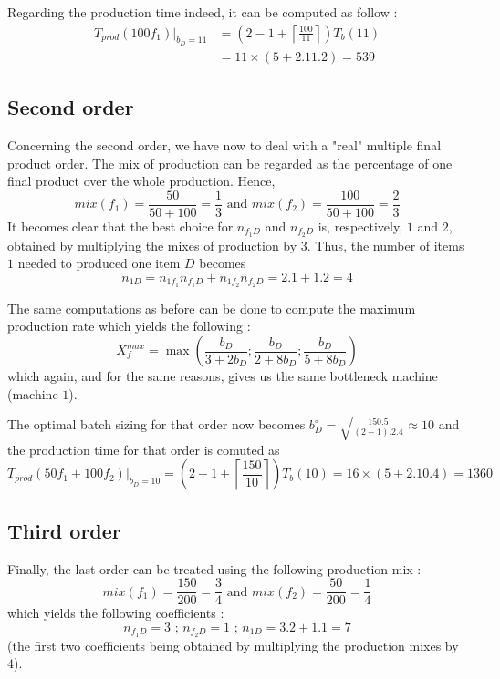 Regarding the production time indeed, it can be computed as follow : 
\[
    \begin{split}
        T_{prod}(100f_1)|_{b_D = 11} &= \left(2-1+\left\lceil \frac{100}{11} \right\rceil\right)T_b(11) \\
        &= 11\times(5+2.11.2) = 539
    \end{split}
\]

\subsection{Second order}

Concerning the second order, we have now to deal with a "real" multiple final product order. The mix of production can be regarded as the percentage of one final product over the whole production. Hence, 
\[
    mix(f_1) = \frac{50}{50 + 100} = \frac{1}{3}\textrm{ and }
    mix(f_2) = \frac{100}{50 + 100} = \frac{2}{3}
\]
It becomes clear that the best choice for $n_{f_1D}$ and $n_{f_2D}$ is, respectively, $1$ and $2$, obtained by multiplying the mixes of production by $3$. Thus, the number of items $1$ needed to produced one item $D$ becomes \[ n_{1D} = n_{1f_1}n_{f_1D} + n_{1f_2}n_{f_2D} = 2.1+1.2 = 4 \]

The same computations as before can be done to compute the maximum production rate which yields the following : 
\[ X_f^{max} = \max\left( \frac{b_D}{3+2b_D} ; \frac{b_D}{2+8b_D} ; \frac{b_D}{5+8b_D} \right) \]
which again, and for the same reasons, gives us the same bottleneck machine (machine $1$). 

The optimal batch sizing for that order now becomes $b_D^\circ = \sqrt{ \frac{150.5}{(2-1).2.4} }\approx 10$ and the production time for that order is comuted as 
\[ T_{prod}(50f_1 + 100f_2)|_{b_D = 10} = \left( 2-1+\left\lceil \frac{150}{10} \right\rceil \right)T_b(10) = 16\times(5+2.10.4) = 1360 \]

\subsection{Third order}

Finally, the last order can be treated using the following production mix :
\[ mix(f_1) = \frac{150}{200} = \frac{3}{4} \textrm{ and } mix(f_2) = \frac{50}{200} = \frac{1}{4} \] which yields the following coefficients : \[ n_{f_1D} = 3\textrm{ ; }n_{f_2D} = 1\textrm{ ; }n_{1D} = 3.2 + 1.1 = 7 \]
(the first two coefficients being obtained by multiplying the production mixes by $4$). 

